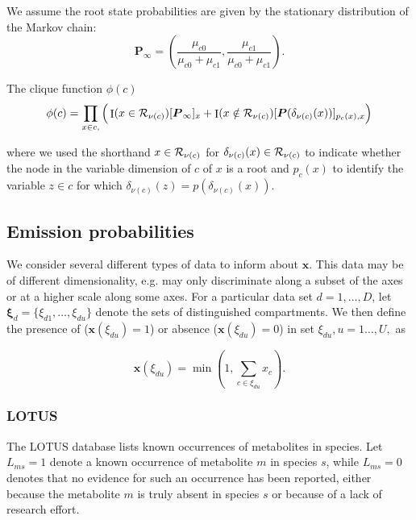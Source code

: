 \documentclass[a4paper,12pt]{article}
\DeclareMathOperator{\Ind}{I}
\def\x{\boldsymbol{x}}
\def\bxi{\boldsymbol{\xi}}
\def\bP{\boldsymbol{P}}
\def\R{{\cal R}}
\begin{document}
We assume the root state probabilities are given by the stationary distribution of the Markov chain:
\begin{equation*}
 \bP_{\infty} = \left(\frac{\mu_{c0}}{\mu_{c0} + \mu_{c1}}, \frac{\mu_{c1}}{\mu_{c0} + \mu_{c1}}\right).
\end{equation*}


The clique function $\phi(c)$
\begin{equation*}
\phi(c) = \prod_{x \in c, }\Big( \Ind(x \in \R_{\nu(c)})[\bP_{\infty}]_x + \Ind(x \notin \R_{\nu(c)}) [\bP(\delta_{\nu(c)}(x))]_{p_{c}(x), x} \Big)
\end{equation*}

where we used the shorthand $x \in \R_{\nu(c)}$ for $\delta_{\nu(c)}(x) \in \R_{\nu(c)}$ to indicate whether the node in the variable dimension of $c$ of $x$ is a root and $p_{c}(x)$ to identify the variable $z \in c$ for which $\delta_{\nu(c)}(z) = p(\delta_{\nu(c)}(x))$.





\subsection{Emission probabilities}

We consider several different types of data to inform about $\x$. This data may be of different dimensionality, e.g. may only discriminate along a subset of the axes or at a higher scale along some axes. For a particular data set $d=1, \ldots, D$, let $\bxi_d=\{\xi_{d1}, \ldots, \xi_{du}\}$ denote the sets of distinguished compartments. We then define the presence of ($\x(\xi_{du})=1$) or absence ($\x(\xi_{du})=0$) in set $\xi_{du}, u=1\ldots,U,$ as

\begin{equation*}
 \x(\xi_{du}) = \min \left(1, \sum_{c \in \xi_{du}} x_c \right).
\end{equation*}


\subsubsection{LOTUS}

 The LOTUS database  lists known occurrences of metabolites in species. Let $L_{ms} = 1$ denote a known occurrence of metabolite $m$ in species $s$, while $L_{ms}=0$ denotes that no evidence for such an occurrence has been reported, either because the metabolite $m$ is truly absent in species $s$ or because of a lack of research effort.
\end{document}

